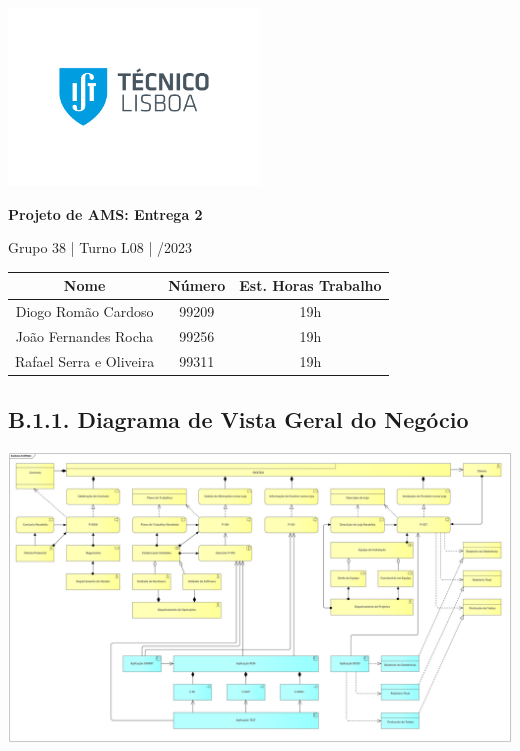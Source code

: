 \documentclass[12pt,a4paper]{article}
\begin{document}
\begin{titlepage}
	\begin{center}

		\vspace*{0.5cm}
		\includegraphics[width=0.5\textwidth]{ist-logo.png}

		\vspace{1cm}
		\Huge
		\textbf{Projeto de AMS: Entrega 2}

		\vspace{0.5cm}
		\LARGE
		Grupo 38 \quad | \quad Turno L08 \quad | /2023

		\vfill
	\end{center}

	\large
	\begin{tabular}{c|c|c}
		\textbf{Nome}           & \textbf{Número} & \textbf{Est. Horas Trabalho} \\
		\hline
		Diogo Romão Cardoso     & 99209           & 19h                          \\
		João Fernandes Rocha    & 99256           & 19h                          \\
		Rafael Serra e Oliveira & 99311           & 19h
	\end{tabular}

	\vspace{5cm}
\end{titlepage}

\begin{landscape}
	\section*{B.1.1. Diagrama de Vista Geral do Negócio}
	\includegraphics[width=1.59\textwidth]{../ArchiMate.png}
\end{landscape}
\end{document}
